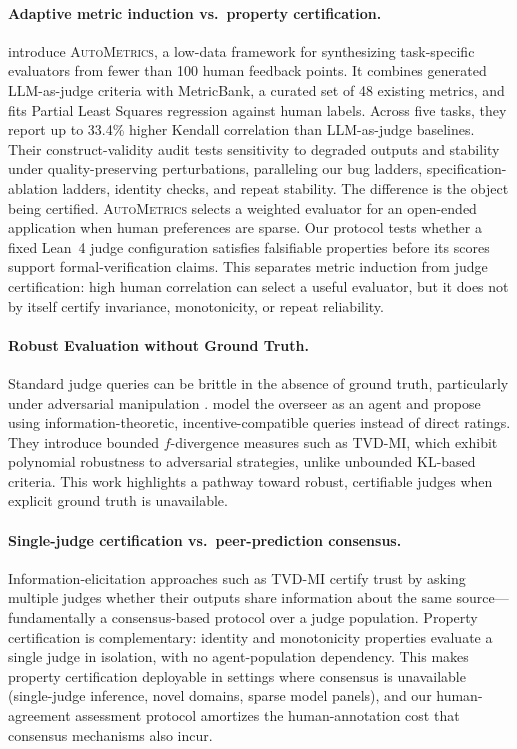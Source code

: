 \documentclass{article}
\begin{document}
\paragraph{Adaptive metric induction vs.\ property certification.}
\citet{ryan2025autometrics} introduce \textsc{AutoMetrics}, a low-data framework for synthesizing task-specific evaluators from fewer than 100 human feedback points.
It combines generated LLM-as-judge criteria with MetricBank, a curated set of 48 existing metrics, and fits Partial Least Squares regression against human labels.
Across five tasks, they report up to 33.4\% higher Kendall correlation than LLM-as-judge baselines.
Their construct-validity audit tests sensitivity to degraded outputs and stability under quality-preserving perturbations, paralleling our bug ladders, specification-ablation ladders, identity checks, and repeat stability.
The difference is the object being certified.
\textsc{AutoMetrics} selects a weighted evaluator for an open-ended application when human preferences are sparse.
Our protocol tests whether a fixed Lean~4 judge configuration satisfies falsifiable properties before its scores support formal-verification claims.
This separates metric induction from judge certification: high human correlation can select a useful evaluator, but it does not by itself certify invariance, monotonicity, or repeat reliability.

\paragraph{Robust Evaluation without Ground Truth.}
Standard judge queries can be brittle in the absence of ground truth, particularly under adversarial manipulation \citep{Zhuo2024ICEScore,TongZhang2024CodeJudge}. \citet{robertson2025stepbystep} model the overseer as an agent and propose using information-theoretic, incentive-compatible queries instead of direct ratings. They introduce bounded $f$-divergence measures such as TVD-MI, which exhibit polynomial robustness to adversarial strategies, unlike unbounded KL-based criteria. This work highlights a pathway toward robust, certifiable judges when explicit ground truth is unavailable.

\paragraph{Single-judge certification vs.\ peer-prediction consensus.}
Information-elicitation approaches such as TVD-MI \citep{robertson2025stepbystep} certify trust by asking multiple judges whether their outputs share information about the same source---fundamentally a consensus-based protocol over a judge population.
Property certification is complementary: identity and monotonicity properties evaluate a single judge in isolation, with no agent-population dependency.
This makes property certification deployable in settings where consensus is unavailable (single-judge inference, novel domains, sparse model panels), and our human-agreement assessment protocol amortizes the human-annotation cost that consensus mechanisms also incur.
\end{document}
